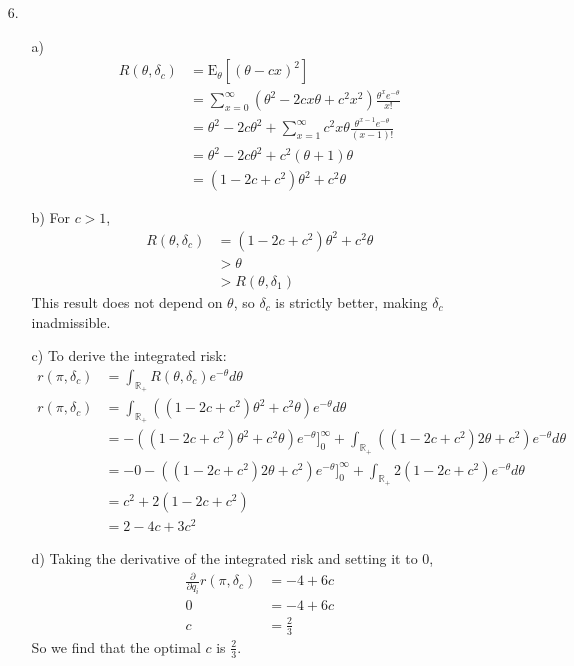 \documentclass[11pt]{article}
\newcommand{\R}{\mathbb{R}}
\newcommand{\E}{\mathrm{E}}
\theoremstyle{definition}
\begin{document}
\begin{itemize}
    \item[6.]
        \begin{itemize}
            \item[a)]
                \begin{align*}
                    R(\theta,\delta_c) &= \E_\theta[(\theta-cx)^2] \\
                                       &= \sum_{x=0}^\infty (\theta^2 -2cx\theta + c^2x^2)\frac{\theta^xe^{-\theta}}{x!} \\
                                       &= \theta^2 -2c\theta^2 + \sum_{x=1}^\infty c^2x\theta\frac{\theta^{x-1}e^{-\theta}}{(x-1)!} \\
                                       &= \theta^2 -2c\theta^2 + c^2(\theta+1)\theta \\
                                       &= (1-2c+c^2)\theta^2 +c^2\theta
                \end{align*}
            \item[b)]
                For $c>1$,
                \begin{align*}
                    R(\theta,\delta_c) &= (1-2c+c^2)\theta^2 +c^2\theta \\
                                       &> \theta \\
                                       &> R(\theta,\delta_1)
                \end{align*}
                This result does not depend on $\theta$, so $\delta_c$ is strictly better, making $\delta_c$ inadmissible.
            \item[c)]
                To derive the integrated risk:
                \begin{align*}
                    r(\pi,\delta_c) &= \int_{\R_+} R(\theta,\delta_c) e^{-\theta}d\theta \\
                    r(\pi,\delta_c) &= \int_{\R_+} \left((1-2c+c^2)\theta^2 +c^2\theta\right) e^{-\theta}d\theta \\
                                    &= -\left((1-2c+c^2)\theta^2 +c^2\theta\right) e^{-\theta}\big]_0^\infty + \int_{\R_+} \left((1-2c+c^2)2\theta +c^2\right) e^{-\theta}d\theta \\
                                    &= -0 - \left((1-2c+c^2)2\theta +c^2\right) e^{-\theta}\big]_0^\infty + \int_{\R_+} 2(1-2c+c^2) e^{-\theta}d\theta \\
                                    &= c^2 + 2(1-2c+c^2) \\
                                    &= 2-4c+3c^2
                \end{align*}
            \item[d)]
                Taking the derivative of the integrated risk and setting it to 0,
                \begin{align*}
                    \frac{\partial}{\partial q_i}r(\pi,\delta_c) &= -4+6c \\
                    0 &= -4 +6c \\
                    c &= \frac{2}{3}
                \end{align*}
                So we find that the optimal $c$ is $\frac{2}{3}$.



\end{itemize}
\end{itemize}
\end{document}
